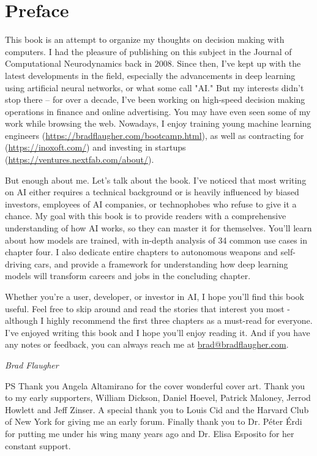 \chapter*{Preface}

This book is an attempt to organize my thoughts on decision making with computers. I had the pleasure of publishing on this subject in the Journal of Computational Neurodynamics back in 2008. Since then, I've kept up with the latest developments in the field, especially the advancements in deep learning using artificial neural networks, or what some call "AI." But my interests didn't stop there – for over a decade, I've been working on high-speed decision making operations in finance and online advertising. You may have even seen some of my work while browsing the web. Nowadays, I enjoy training young machine learning engineers (\url{https://bradflaugher.com/bootcamp.html}), as well as contracting for (\url{https://inoxoft.com/}) and investing in startups (\url{https://ventures.nextfab.com/about/}).

But enough about me. Let's talk about the book. I've noticed that most writing on AI either requires a technical background or is heavily influenced by biased investors, employees of AI companies, or technophobes who refuse to give it a chance. My goal with this book is to provide readers with a comprehensive understanding of how AI works, so they can master it for themselves. You'll learn about how models are trained, with in-depth analysis of 34 common use cases in chapter four. I also dedicate entire chapters to autonomous weapons and self-driving cars, and provide a framework for understanding how deep learning models will transform careers and jobs in the concluding chapter.

Whether you're a user, developer, or investor in AI, I hope you'll find this book useful. Feel free to skip around and read the stories that interest you most - although I highly recommend the first three chapters as a must-read for everyone. I've enjoyed writing this book and I hope you'll enjoy reading it. And if you have any notes or feedback, you can always reach me at \href{mailto:brad@bradflaugher.com}{brad@bradflaugher.com}.

\begin{flushright}
	\textit{Brad Flaugher}
\end{flushright}

PS Thank you Angela Altamirano for the cover wonderful cover art. Thank you to my early supporters, William Dickson, Daniel Hoevel, Patrick Maloney, Jerrod Howlett and Jeff Zinser. A special thank you to Louis Cid and the Harvard Club of New York for giving me an early forum. Finally thank you to Dr. Péter Érdi for putting me under his wing many years ago and Dr. Elisa Esposito for her constant support. 

